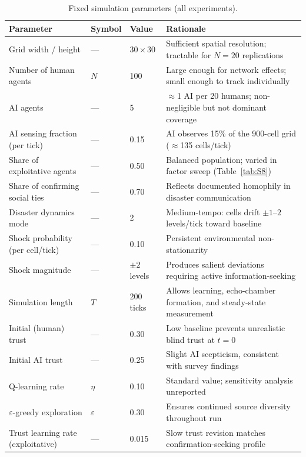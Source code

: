 \begin{table}[h]
\centering
\caption{Fixed simulation parameters (all experiments).}
\label{tab:S1}
\small
\begin{tabular}{llll}
\toprule
Parameter & Symbol & Value & Rationale \\
\midrule
Grid width / height         & ---  & $30\times30$   & Sufficient spatial resolution; tractable for $N=20$ replications \\
Number of human agents      & $N$  & 100            & Large enough for network effects; small enough to track individually \\
AI agents                   & ---  & 5              & $\approx$1 AI per 20 humans; non-negligible but not dominant coverage \\
AI sensing fraction (per tick) & ---& 0.15          & AI observes 15\% of the 900-cell grid ($\approx$135 cells/tick) \\
Share of exploitative agents & ---  & 0.50          & Balanced population; varied in factor sweep (Table~\ref{tab:S8}) \\
Share of confirming social ties & --- & 0.70        & Reflects documented homophily in disaster communication \\
Disaster dynamics mode      & ---  & 2              & Medium-tempo: cells drift $\pm1$--$2$ levels/tick toward baseline \\
Shock probability (per cell/tick) & --- & 0.10      & Persistent environmental non-stationarity \\
Shock magnitude             & ---  & $\pm2$ levels  & Produces salient deviations requiring active information-seeking \\
Simulation length           & $T$  & 200 ticks      & Allows learning, echo-chamber formation, and steady-state measurement \\
Initial (human) trust       & ---  & 0.30           & Low baseline prevents unrealistic blind trust at $t=0$ \\
Initial AI trust            & ---  & 0.25           & Slight AI scepticism, consistent with survey findings \\
Q-learning rate             & $\eta$ & 0.10         & Standard value; sensitivity analysis unreported \\
$\varepsilon$-greedy exploration & $\varepsilon$ & 0.30 & Ensures continued source diversity throughout run \\
Trust learning rate (exploitative) & --- & 0.015   & Slow trust revision matches confirmation-seeking profile \\

\end{tabular}
\end{table}
